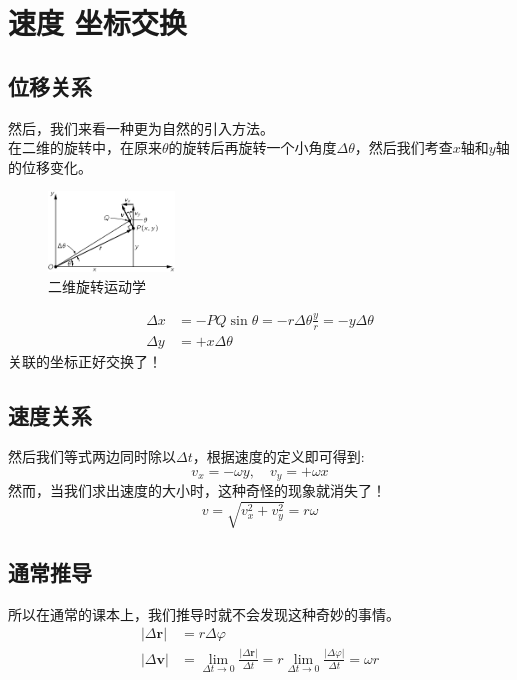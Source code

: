 \maketitle
\chapter{速度 坐标交换}
\section{位移关系}
然后，我们来看一种更为自然的引入方法。\\
在二维的旋转中，在原来$\theta$的旋转后再旋转一个小角度$\Delta\theta$，然后我们考查$x$轴和$y$轴的位移变化。
\begin{figure}
  \centering
  \includegraphics[width=0.3\textwidth]{pic1.png}
  \caption{二维旋转运动学}\label{1}
\end{figure}
\begin{align}
\Delta x & =-PQ \sin\theta=-r\Delta\theta \frac{y}{r}=-y\Delta\theta \\
\Delta y & =+x\Delta\theta
\end{align}
关联的坐标正好交换了！\\
\section{速度关系}
然后我们等式两边同时除以$\Delta t$，根据速度的定义即可得到:
  \begin{equation}
    v_x=-\omega y,\quad  v_y=+\omega x
  \end{equation}
然而，当我们求出速度的大小时，这种奇怪的现象就消失了！
\begin{equation}
  v=\sqrt{v_x^2+v_y^2}=r\omega
\end{equation}
\section{通常推导}
所以在通常的课本上，我们推导时就不会发现这种奇妙的事情。
\begin{align}
  |\Delta \bm{r}|& =r\Delta\varphi \\
  |\Delta \bm{v}|& =\lim_{\Delta t \rightarrow 0} \frac{|\Delta \bm{r}|}{\Delta t}= r \lim_{\Delta t \rightarrow 0}\frac{|\Delta \varphi|}{\Delta t}= \omega r
\end{align}

